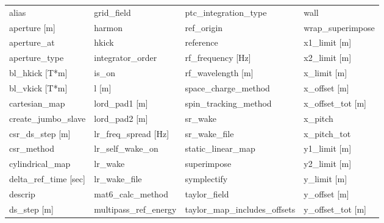  \begin{tabular}{llll} \toprule
alias                            & grid_field                       & ptc_integration_type             & wall                             \\
aperture [m]                     & harmon                           & ref_origin                       & wrap_superimpose                 \\
aperture_at                      & hkick                            & reference                        & x1_limit [m]                     \\
aperture_type                    & integrator_order                 & rf_frequency [Hz]                & x2_limit [m]                     \\
bl_hkick [T*m]                   & is_on                            & rf_wavelength [m]                & x_limit [m]                      \\
bl_vkick [T*m]                   & l [m]                            & space_charge_method              & x_offset [m]                     \\
cartesian_map                    & lord_pad1 [m]                    & spin_tracking_method             & x_offset_tot [m]                 \\
create_jumbo_slave               & lord_pad2 [m]                    & sr_wake                          & x_pitch                          \\
csr_ds_step [m]                  & lr_freq_spread [Hz]              & sr_wake_file                     & x_pitch_tot                      \\
csr_method                       & lr_self_wake_on                  & static_linear_map                & y1_limit [m]                     \\
cylindrical_map                  & lr_wake                          & superimpose                      & y2_limit [m]                     \\
delta_ref_time [sec]             & lr_wake_file                     & symplectify                      & y_limit [m]                      \\
descrip                          & mat6_calc_method                 & taylor_field                     & y_offset [m]                     \\
ds_step [m]                      & multipass_ref_energy             & taylor_map_includes_offsets      & y_offset_tot [m]                 \\

\end{tabular}
